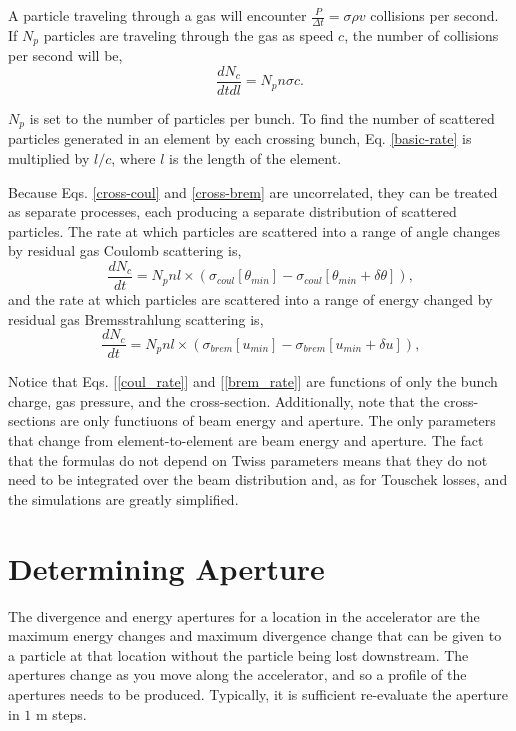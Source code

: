 \documentclass[a4paper,10pt]{article}
\begin{document}
A particle traveling through a gas will encounter $\frac{P}{\Delta t}=\sigma\rho v$ collisions per second.  If $N_p$ particles are traveling through the gas as speed $c$, the number of collisions per second will be,
\begin{equation}
\frac{d N_c}{dt dl}=N_p n \sigma c\textrm{.}
\label{basic-rate}
\end{equation}

$N_p$ is set to the number of particles per bunch.  To find the number of scattered particles generated in an element by each crossing bunch, Eq. \ref{basic-rate} is multiplied by $l/c$, where $l$ is the length of the element.

Because Eqs. \ref{cross-coul} and \ref{cross-brem} are uncorrelated, they can be treated as separate processes, each producing a separate distribution of scattered particles.  The rate at which particles are scattered into a range of angle changes by residual gas Coulomb scattering is,
\begin{equation}
\frac{d N_c}{dt}=N_p n l \times\left(\sigma_{coul}\left[\theta_{min}\right]-\sigma_{coul}\left[\theta_{min}+\delta\theta\right]\right)\textrm{,}
\label{coul_rate}
\end{equation}
and the rate at which particles are scattered into a range of energy changed by residual gas Bremsstrahlung scattering is,
\begin{equation}
\frac{d N_c}{dt}=N_p n l \times\left(\sigma_{brem}\left[u_{min}\right]-\sigma_{brem}\left[u_{min}+\delta u\right]\right)\textrm{,}
\label{brem_rate}
\end{equation}

Notice that Eqs. [\ref{coul_rate}] and [\ref{brem_rate}] are functions of only the bunch charge, gas pressure, and the cross-section.  Additionally, 
note that the cross-sections are only functiuons of beam energy and aperture.  The only parameters that change from element-to-element are beam
energy and aperture.  The fact that the formulas do not depend on Twiss parameters means that they do not need to be integrated over the beam
distribution and, as for Touschek losses, and the simulations are greatly simplified.

\section{Determining Aperture}

The divergence and energy apertures for a location in the accelerator are the maximum energy changes and maximum divergence 
change that can be given to a particle at that location without the particle being lost downstream.  The apertures change as you move 
along the accelerator, and so a profile of the apertures needs to be produced.  Typically, it is sufficient re-evaluate the aperture
in $1$ m steps.
\end{document}
